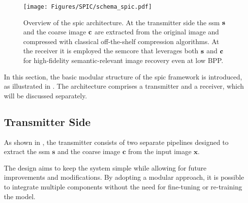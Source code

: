 \begin{figure}
    \centering
    \texttt{[image: Figures/SPIC/schema\_spic.pdf]}
    \caption[\acrshort{spic} architecture scheme]{Overview of the \acrshort{spic} architecture. At the transmitter side the \acrshort{ssm} $\mathbf{s}$ and the coarse image $\mathbf{c}$ are extracted from the original image and compressed with classical off-the-shelf compression algorithms. At the receiver it is employed the \acrshort{semcore} that leverages both $\mathbf{s}$ and $\mathbf{c}$ for high-fidelity semantic-relevant image recovery even at low BPP.}
    \label{fig: SPIC spic_scheme}
\end{figure}

In this section, the basic modular structure of the \gls{spic} framework is introduced, as illustrated in . The architecture comprises a transmitter and a receiver, which will be discussed separately.

\subsection{Transmitter Side}\label{sec: SPIC spic_transmitter}

As shown in , the transmitter consists of two separate pipelines designed to extract the \gls{ssm} $\mathbf{s}$ and the coarse image $\mathbf{c}$ from the input image $\mathbf{x}$.

The design aims to keep the system simple while allowing for future improvements and modifications. By adopting a modular approach, it is possible to integrate multiple components without the need for fine-tuning or re-training the model.

